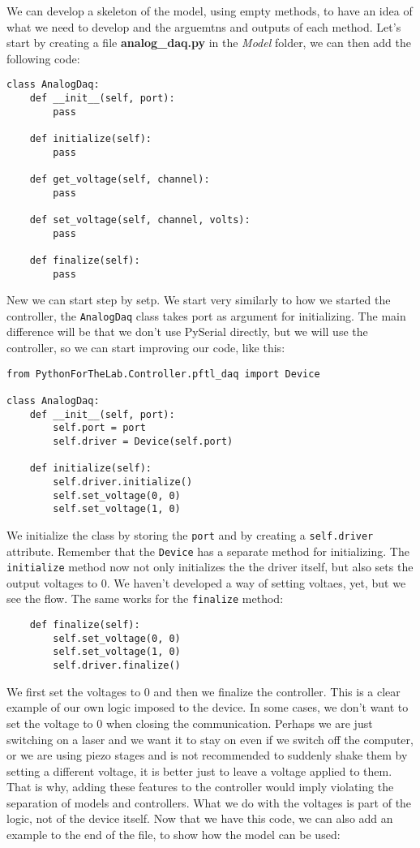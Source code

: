 We can develop a skeleton of the model, using empty methods, to have an idea of what we need to develop and the arguemtns and outputs of each method. Let's start by creating a file \textbf{analog\_daq.py} in the \emph{Model} folder, we can then add the following code:

\begin{verbatim}
class AnalogDaq:
    def __init__(self, port):
        pass
    
    def initialize(self):
        pass
    
    def get_voltage(self, channel):
        pass
    
    def set_voltage(self, channel, volts):
        pass
    
    def finalize(self):
        pass
\end{verbatim}

New we can start step by setp. We start very similarly to how we started the controller, the \texttt{AnalogDaq} class takes port as argument for initializing. The main difference will be that we don't use PySerial directly, but we will use the controller, so we can start improving our code, like this:

\begin{verbatim}
from PythonForTheLab.Controller.pftl_daq import Device
 
class AnalogDaq:
    def __init__(self, port):
        self.port = port
        self.driver = Device(self.port)
    
    def initialize(self):
        self.driver.initialize()
        self.set_voltage(0, 0)
        self.set_voltage(1, 0)
\end{verbatim}

We initialize the class by storing the \texttt{port} and by creating a \texttt{self.driver} attribute. Remember that the \texttt{Device} has a separate method for initializing. The \texttt{initialize} method now not only initializes the the driver itself, but also sets the output voltages to 0. We haven't developed a way of setting voltaes, yet, but we see the flow. The same works for the \texttt{finalize} method:

\begin{verbatim}
    def finalize(self):
        self.set_voltage(0, 0)
        self.set_voltage(1, 0)
        self.driver.finalize()
\end{verbatim}

We first set the voltages to 0 and then we finalize the controller. This is a clear example of our own logic imposed to the device. In some cases, we don't want to set the voltage to 0 when closing the communication. Perhaps we are just switching on a laser and we want it to stay on even if we switch off the computer, or we are using piezo stages and is not recommended to suddenly shake them by setting a different voltage, it is better just to leave a voltage applied to them. That is why, adding these features to the controller would imply violating the separation of models and controllers. What we do with the voltages is part of the logic, not of the device itself. Now that we have this code, we can also add an example to the end of the file, to show how the model can be used:

